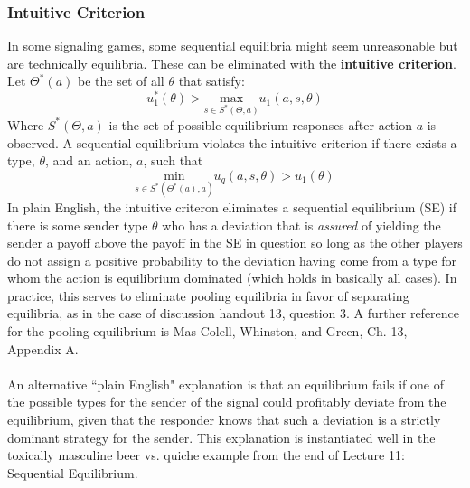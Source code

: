 \documentclass{article}
\newcommand{\red}[1]{{\color{red}#1}}
\begin{document}
\subsubsection{Intuitive Criterion}
In some signaling games, some sequential equilibria might seem unreasonable but are technically equilibria. These can be eliminated with the \textbf{intuitive criterion}. Let $\Theta^*(a)$ be the set of all $\theta$ that satisfy:
\[
	u_1^*(\theta) > \underset{s\in S^*(\Theta,a)}{\text{max}}u_1(a,s,\theta)
\]
Where $S^*(\Theta,a)$ is the set of possible equilibrium responses after action $a$ is observed. A sequential equilibrium violates the intuitive criterion if there exists a type, $\theta$, and an action, $a$, such that 
\[
	\underset{s\in S^*(\Theta^*(a),a)}{\text{min}}u_q(a,s,\theta)>u_1(\theta)
\]
In plain English, the intuitive criteron eliminates a sequential equilibrium (SE) if there is some sender type $\theta$ who has a deviation that is \textit{assured} of yielding the sender a payoff above the payoff in the SE in question so long as the other players do not assign a positive probability to the deviation having come from a type for whom the action is equilibrium dominated (which holds in basically all cases). In practice, this serves to eliminate pooling equilibria in favor of separating equilibria, as in the case of \red{discussion handout 13, question 3}. A further reference for the pooling equilibrium is \red{Mas-Colell, Whinston, and Green, Ch. 13, Appendix A}. \\
\\
An alternative ``plain English" explanation is that an equilibrium fails if one of the possible types for the sender of the signal could profitably deviate from the equilibrium, given that the responder knows that such a deviation is a strictly dominant strategy for the sender. This explanation is instantiated well in \red{the toxically masculine beer vs. quiche example from the end of Lecture 11: Sequential Equilibrium}.

\end{document}
